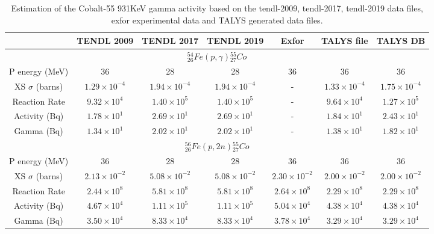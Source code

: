 \begin{table}[h]
\begin{center}
\begin{tabular}{c c c c c c c}
\hline\hline
 & TENDL 2009 & TENDL 2017 & TENDL 2019 & Exfor & TALYS file & TALYS DB \\
\hline\hline
\multicolumn{7}{c}{${}^{54}_{26}Fe(p,\gamma){}^{55}_{27}Co$}\\
P energy (MeV) & 36 & 28 & 28 & 36 & 36 & 36  \\
XS $\sigma$ (barns) & $1.29 \times 10^{-4}$ & $1.94 \times 10^{-4}$ & $1.94\times 10^{-4}$ & - & $1.33 \times 10^{-4}$ & $1.75 \times 10^{-4}$ \\
Reaction Rate & $9.32 \times 10^{4}$ & $1.40 \times 10^{5}$ & $1.40 \times 10^{5}$ & -  & $9.64 \times 10^{4}$ & $1.27\times 10^{5}$ \\
Activity (Bq) & $1.78 \times 10^{1}$ & $2.69 \times 10^{1}$ & $2.69 \times 10^{1}$ & -  & $1.84 \times 10^{1}$ & $2.43 \times 10^{1}$ \\
Gamma (Bq) & $1.34 \times 10^{1}$ & $2.02 \times 10^{1}$ & $2.02 \times 10^{1}$ & -  & $1.38 \times 10^{1}$ & $1.82 \times 10^{1}$ \\
\multicolumn{7}{c}{${}^{56}_{26}Fe(p,2n){}^{55}_{27}Co$}\\
P energy (MeV) & 36 & 28 & 28 & 36 & 36 & 36  \\
XS $\sigma$ (barns) & $2.13 \times 10^{-2}$ & $5.08 \times 10^{-2}$ & $5.08\times 10^{-2}$ & $2.30\times 10^{-2}$ & $2.00 \times 10^{-2}$ & $2.00 \times 10^{-2}$ \\
Reaction Rate & $2.44 \times 10^{8}$ & $5.81 \times 10^{8}$ & $5.81 \times 10^{8}$ & $2.64 \times 10^{8}$  & $2.29 \times 10^{8}$ & $2.29\times 10^{8}$ \\
Activity (Bq) & $4.67 \times 10^{4}$ & $1.11 \times 10^{5}$ & $1.11 \times 10^{5}$ & $5.04 \times 10^{4}$  & $4.38 \times 10^{4}$ & $4.38 \times 10^{4}$ \\
Gamma (Bq) & $3.50 \times 10^{4}$ & $8.33 \times 10^{4}$ & $8.33 \times 10^{4}$ & $3.78 \times 10^{4}$  & $3.29 \times 10^{4}$ & $3.29 \times 10^{4}$ \\
\hline\hline
\end{tabular}
\end{center}
\caption{Estimation of the Cobalt-55 931KeV gamma activity based on the \acrshort{tendl}-2009\cite{tendl2009}, \acrshort{tendl}-2017\cite{tendl2017}, \acrshort{tendl}-2019\cite{tendl2019} data files, \acrshort{exfor} experimental data \cite{exforco55} and TALYS generated data files\cite{talys}.}
\label{table:activityestimation2}
\end{table}


